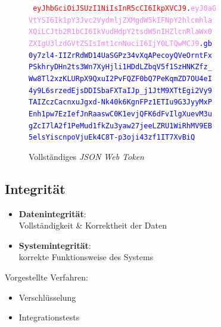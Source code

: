 \documentclass{beamer}
\begin{document}
\begin{frame}{\insertsubsection}
	\begin{figure}
		{\tt \textcolor{red}{
				eyJhbGciOiJSUzI1NiIsInR5cCI6IkpXVCJ9}.\textcolor{violet}{eyJ0aG\\
				VtYSI6Ik1pY3Jvc2VydmljZXMgdW5kIFNpY2hlcmhla\\
				XQiLCJtb2R1bCI6IkVudHdpY2tsdW5nIHZlcnRlaWx0\\
				ZXIgU3lzdGVtZSIsImt1cnNuciI6IjY0LTQwMCJ9}.\textcolor{blue}{gb\\
				0y7zl4-IIZrRdWD14UaSGPz34vXqAPecoyQVeOrntFx\\
				PSkhryDHn2ts3Wn7XyHjli1HDdLZbqV5f1SzHNKZfz\_\\
				Ww8Tl2xzKLURpX9QxuI2PvFQZF0bQ7PeKqmZD7OU4eI\\
				4y9L6srzedEjsDDISbaFXTaIJp\_j1JtM9XTtEgi2Vy9\\
				TAIZczCacnxuJgxd-Nk40k6KgnFPz1ETIu9G3JyyMxP\\
				Enh1pw7EzIefJnRaaswC0K1evjQFK6dFvIlgXuevM3u\\
				gZcI7lA2f1PeMud1fkZu3yaw27jeeLZRU1WiRhMV9EB\\
				5elsYiscnpoVjuEk4C8T-p3oji43zf1IT7XvBiQ}}
		\caption{Vollständiges \textit{JSON Web Token}}
	\end{figure}
\end{frame}

\subsection{Integrität}
\begin{frame}{\insertsubsection}
	\begin{itemize}
		\item \textbf{Datenintegrität}:\\
			Vollständigkeit \& Korrektheit der Daten
		\item \textbf{Systemintegrität}:\\
			korrekte Funktionsweise des Systems
	\end{itemize}
	\vspace*{1cm}
	\pause
	Vorgestellte Verfahren:
	\begin{itemize}
		\item Verschlüsselung
		\item Integrationstests
	\end{itemize}
\end{frame}
\end{document}
